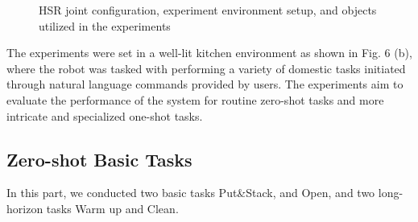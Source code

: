 \documentclass[letterpaper,conference]{ieeeconf}
\begin{document}
\begin{figure}[t]
{   \label{fig:apple}
}
\hspace{3pt}
\hspace{3pt}

\caption{HSR joint configuration, experiment environment setup, and objects utilized in the experiments}
\label{fig:full_config}
 \vspace{-4mm}
\end{figure}

The experiments were set in a well-lit kitchen environment as shown in Fig. 6 (b), where the robot was tasked with performing a variety of domestic tasks initiated through natural language commands provided by users. 
The experiments aim to evaluate the performance of the system for routine zero-shot tasks and more intricate and specialized one-shot tasks.
\subsection{Zero-shot Basic Tasks}
In this part, we conducted two basic tasks {Put\&Stack, and Open}, and two long-horizon tasks {Warm up and Clean}. 
\end{document}
